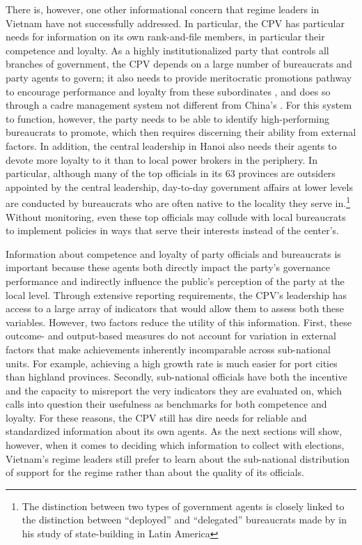 \documentclass[12pt]{article}
\newcommand{\1}{\mathbbm{1}}
\begin{document}
There is, however, one other informational concern that regime leaders in Vietnam have not successfully addressed. In particular, the CPV has particular needs for information on its own rank-and-file members, in particular their competence and loyalty. As a highly institutionalized party that controls all branches of government, the CPV depends on a large number of bureaucrats and party agents to govern; it also needs to provide meritocratic promotions pathway to encourage performance and loyalty from these subordinates \citep{Svolik2012}, and does so through a cadre management system not different from China's \citep{Manion1985}. For this system to function, however, the party needs to be able to identify high-performing bureaucrats to promote, which then requires discerning their ability from external factors. In addition, the central leadership in Hanoi also needs their agents to devote more loyalty to it than to local power brokers in the periphery. In particular, although many of the top officials in its 63 provinces are outsiders appointed by the central leadership, day-to-day government affairs at lower levels are conducted by bureaucrats who are often native to the locality they serve in.\footnote{The distinction between two types of government agents is closely linked to the distinction between ``deployed'' and ``delegated'' bureaucrats made by \cite{Soifer2015} in his study of state-building in Latin America} Without monitoring, even these top officials may collude with local bureaucrats to implement policies in ways that serve their interests instead of the center's.

Information about competence and loyalty of party officials and bureaucrats is important because these agents both directly impact the party's governance performance and indirectly influence the public's perception of the party at the local level. Through extensive reporting requirements, the CPV's leadership has access to a large array of indicators that would allow them to assess both these variables. However, two factors reduce the utility of this information. First, these outcome- and output-based measures do not account for variation in external factors that make achievements inherently incomparable across sub-national units. For example, achieving a high growth rate is much easier for port cities than highland provinces. Secondly, sub-national officials have both the incentive and the capacity to misreport the very indicators they are evaluated on, which calls into question their usefulness as benchmarks for both competence and loyalty. For these reasons, the CPV still has dire needs for reliable and standardized information about its own agents. As the next sections will show, however, when it comes to deciding which information to collect with elections, Vietnam's regime leaders still prefer to learn about the sub-national distribution of support for the regime rather than about the quality of its officials.  
\end{document}

